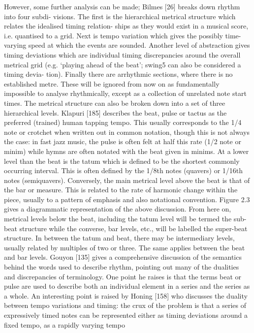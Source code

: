 However, some further analysis can be made; Bilmes [26] breaks down rhythm into four subdi-
visions. The first is the hierarchical metrical structure which relates the idealised timing relation-
ships as they would exist in a musical score, i.e. quantised to a grid. Next is tempo variation
which gives the possibly time-varying speed at which the events are sounded. Another level of
abstraction gives timing deviations which are individual timing discrepancies around the overall
metrical grid (e.g. ‘playing ahead of the beat’; swing5 can also be considered a timing devia-
tion). Finally there are arrhythmic sections, where there is no established metre. These will be
ignored from now on as fundamentally impossible to analyse rhythmically, except as a collection
of unrelated note start times.
The metrical structure can also be broken down into a set of three hierarchical levels. Klapuri
[185] describes the beat, pulse or tactus as the preferred (trained) human tapping tempo. This
usually corresponds to the 1/4 note or crotchet when written out in common notation, though this
is not always the case: in fast jazz music, the pulse is often felt at half this rate (1/2 note or minim)
while hymns are often notated with the beat given in minims. At a lower level than the beat is the
tatum which is defined to be the shortest commonly occurring interval. This is often defined by the
1/8th notes (quavers) or 1/16th notes (semiquavers). Conversely, the main metrical level above the
beat is that of the bar or measure. This is related to the rate of harmonic change within the piece,
usually to a pattern of emphasis and also notational convention. Figure 2.3 gives a diagrammatic
representation of the above discussion. From here on, metrical levels below the beat, including
the tatum level will be termed the sub-beat structure while the converse, bar levels, etc., will
be labelled the super-beat structure. In between the tatum and beat, there may be intermediary
levels, usually related by multiples of two or three. The same applies between the beat and bar
levels. Gouyon [135] gives a comprehensive discussion of the semantics behind the words used to
describe rhythm, pointing out many of the dualities and discrepancies of terminology. One point
he raises is that the terms beat or pulse are used to describe both an individual element in a series
and the series as a whole.
An interesting point is raised by Honing [158] who discusses the duality between tempo
variations and timing: the crux of the problem is that a series of expressively timed notes can
be represented either as timing deviations around a fixed tempo, as a rapidly varying tempo

